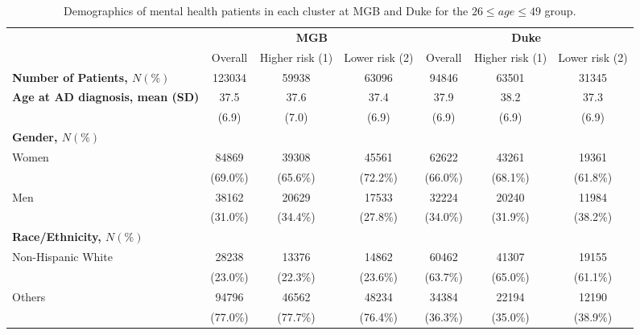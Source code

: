 \documentclass{article}
\begin{document}
\begin{table}[H]
    \centering
    \scriptsize
    \begin{tabular}{l c c c c c c}
\toprule
& \multicolumn{3}{c}{\textbf{MGB}}&
\multicolumn{3}{c}{\textbf{Duke}}\\
\cmidrule(r){2-4}\cmidrule(l){5-7}
& Overall & Higher risk (1) & Lower risk (2) & Overall & Higher risk (1) & Lower risk (2)  \\
\bottomrule
\textbf{Number of Patients, $N(\%)$} & 123034 & 59938 & 63096 & 94846 & 63501 & 31345 \\
\bottomrule
\textbf{Age at AD diagnosis, mean (SD)} & 37.5 & 37.6 & 37.4 & 37.9 & 38.2 & 37.3 \\
 & (6.9) & (7.0) & (6.9) & (6.9) & (6.9) & (6.9) \\
\bottomrule
\textbf{Gender, $N(\%)$}\\
Women & 84869 & 39308 & 45561 & 62622 & 43261 & 19361 \\
 & (69.0\%) & (65.6\%) & (72.2\%) & (66.0\%) & (68.1\%) & (61.8\%)  \\
Men & 38162 & 20629 & 17533 & 32224 & 20240 & 11984 \\
 & (31.0\%) & (34.4\%) & (27.8\%) & (34.0\%) & (31.9\%) & (38.2\%) \\
\bottomrule
\textbf{Race/Ethnicity, $N(\%)$} \\
Non-Hispanic White & 28238 & 13376 & 14862 & 60462 & 41307 & 19155 \\
 &  (23.0\%) & (22.3\%) & (23.6\%) & (63.7\%) & (65.0\%) & (61.1\%)\\
Others & 94796 & 46562 & 48234 & 34384 & 22194 & 12190 \\
 &  (77.0\%) & (77.7\%) & (76.4\%) & (36.3\%) & (35.0\%) & (38.9\%) \\
\bottomrule
\end{tabular}
\caption{Demographics of mental health patients in each cluster at MGB and Duke for the $26 \le age \le 49$ group.}
\label{tab:mental_demo_26-49}
\end{table}
\end{document}
